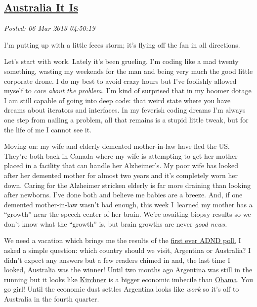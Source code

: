 %

\subsection*{\href{https://bakerjd99.wordpress.com/2013/03/05/australia-it-is/}{Australia It Is}}


\noindent\emph{Posted: 06 Mar 2013 04:50:19}
\vspace{6pt}

I'm putting up with a little feces storm; it's flying off the fan in all
directions.

Let's start with work. Lately it's been grueling. I'm coding like a mad
twenty something, wasting my weekends for the man and being very much
the good little corporate drone. I do my best to avoid crazy hours but
I've foolishly allowed myself to \emph{care about the problem.} I'm kind
of surprised that in my boomer dotage I am still capable of going into
deep code: that weird state where you have dreams about iterators and
interfaces. In my feverish coding dreams I'm always one step from
nailing a problem, all that remains is a stupid little tweak, but for
the life of me I cannot see it.

Moving on: my wife and elderly demented mother-in-law have fled the US.
They're both back in Canada where my wife is attempting to get her
mother placed in a facility that can handle her Alzheimer's. My poor wife
has looked after her demented mother for almost two years and it's
completely worn her down. Caring for the Alzheimer stricken elderly is
far more draining than looking after newborns. I've done both and
believe me babies are a breeze. And, if one demented mother-in-law
wasn't bad enough, this week I~learned my mother has a ``growth'' near
the speech center of her brain. We're awaiting biopsy results so we
don't know what the ``growth'' is, but brain growths are never \emph{good
news.}

We need a vacation which brings me the results of the
\href{http://polldaddy.com/poll/6805019/}{first ever ADND poll.} I
asked a simple question: which country should we visit, Argentina or
Australia? I didn't expect any answers but a few readers chimed in and,
the last time I looked, Australia was the winner! Until two months ago
Argentina was still in the running but it looks like
\href{http://www.telegraph.co.uk/news/worldnews/southamerica/argentina/9890078/Argentina-dispatch-the-troubled-reign-of-Queen-Cristina-of-Argentina.html}{Kirchner} is
a bigger economic imbecile than
\href{http://news.investors.com/ibd-editorials/010713-639635-obama-says-there-is-no-spending-problem.htm}{Obama}.
You go girl! Until the economic dust settles Argentina looks like
\emph{work} so it's off to Australia in the fourth quarter.

